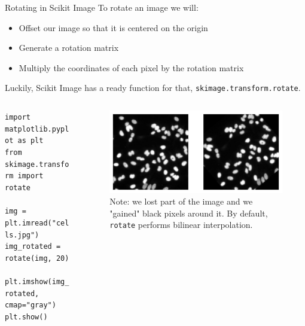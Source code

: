 \documentclass[9pt, aspectratio=169]{beamer}
\begin{document}
\begin{frame}
    {Rotating in Scikit Image}
    To rotate an image we will:
    \begin{itemize}
        \item Offset our image so that it is centered on the origin
        \item Generate a rotation matrix
        \item Multiply the coordinates of each pixel by the rotation matrix
    \end{itemize}
    \pause
    Luckily, Scikit Image has a ready function for that, \texttt{skimage.transform.rotate}.

    \begin{columns}
        \begin{column}{0.5\textwidth}
            \begin{codebox}
                \texttt{import matplotlib.pyplot as plt\\
                    from skimage.transform import rotate\\
                    \\
                    img = plt.imread("cells.jpg")\\
                    img\_rotated = rotate(img, 20)\\
                    \\
                    plt.imshow(img\_rotated, cmap="gray")\\
                    plt.show()}
            \end{codebox}
        \end{column}
        \begin{column}{0.5\textwidth}
            \begin{figure}
                \includegraphics[width=\textwidth]{rotate_image.png}
                \caption{Note: we lost part of the image and we "gained" black pixels around it. By default, \texttt{rotate} performs bilinear interpolation.}
            \end{figure}
        \end{column}
    \end{columns}
\end{frame}
\end{document}
